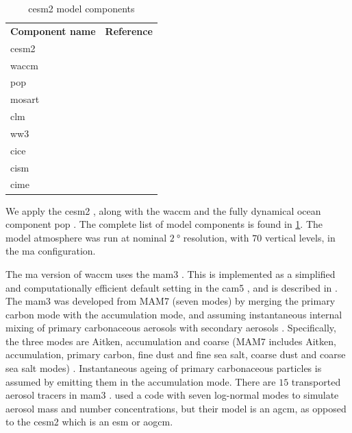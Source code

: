 \documentclass{ametsocV5}
\begin{document}
\begin{table}
  \caption{\acl*{cesm2} model components}%
  \label{tab:cesm-components}
  \begin{center}
    \begin{tabular}[c]{ll}
      \multicolumn{1}{c}{\textbf{Component name}} &
      \multicolumn{1}{c}{\textbf{Reference}}                                              \\
      \acl*{cesm2}                                & \citet{danabasoglu2020}               \\
      \acl*{waccm}                                & \citet{gettleman2019}                 \\
      \acl*{pop}                                  & \citet{smith2010, danabasoglu2020}    \\
      \acl*{mosart}                               & \citet{li2013, danabasoglu2020}       \\
      \acl*{clm}                                  & \citet{lawrence2019, danabasoglu2020} \\
      \acl*{ww3}                                  & \citet{danabasoglu2020}               \\
      \acl*{cice}                                 & \citet{danabasoglu2020}               \\
      \acl*{cism}                                 & \citet{danabasoglu2020}               \\
      \acl*{cime}                                 & \citet{danabasoglu2020}
    \end{tabular}
  \end{center}
\end{table}

We apply the \ac{cesm2} \citep{danabasoglu2020}, along with the \ac{waccm}
\citep{gettleman2019} and the fully dynamical ocean component \ac{pop} \citep{smith2010,
  danabasoglu2020}. The complete list of model components is found in
\cref{tab:cesm-components}. The model atmosphere was run at nominal \(\SI{2}{\degree}\)
resolution, with \(70\) vertical levels, in the \ac{ma} configuration.

The \ac{ma} version of \ac{waccm} uses the \ac{mam3} \citep{gettleman2019}. This is
implemented as a simplified and computationally efficient default setting in the
\ac{cam5} \citep{liu2016}, and is described in \citet{liu2012}. The \ac{mam3} was
developed from MAM7 (seven modes) by merging the primary carbon mode with the
accumulation mode, and assuming instantaneous internal mixing of primary carbonaceous
aerosols with secondary aerosols \citep{liu2016}. Specifically, the three modes are
Aitken, accumulation and coarse (MAM7 includes Aitken, accumulation, primary carbon,
fine dust and fine sea salt, coarse dust and coarse sea salt modes) \citep{liu2016}.
Instantaneous ageing of primary carbonaceous particles is assumed by emitting them in
the accumulation mode. There are \(15\) transported aerosol tracers in \ac{mam3}
\citep{liu2016}. \citet{marshall2019, marshall2020, marshall2021} used a code with seven
log-normal modes to simulate aerosol mass and number concentrations, but their model is
an \ac{agcm}, as opposed to the \ac{cesm2} which is an \ac{esm} or \ac{aogcm}.
\end{document}
